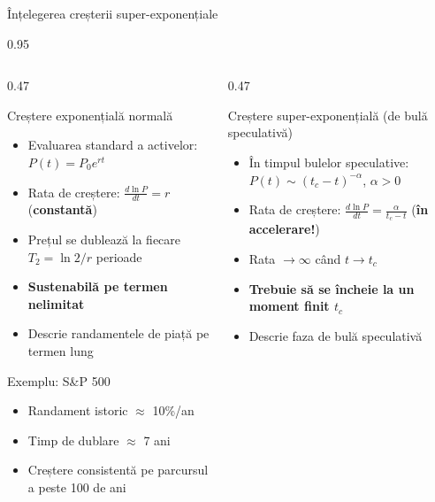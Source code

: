 \documentclass[9pt, aspectratio=169, t]{beamer}
\begin{document}
\begin{frame}{Înțelegerea creșterii super-exponențiale}
    \begin{cminipage}{0.95\textwidth}
    {\footnotesize
    \begin{columns}[T]
        \begin{column}{0.47\textwidth}
            \begin{block}{Creștere exponențială normală}
                \begin{itemize}\setlength{\itemsep}{0pt}
                    \item Evaluarea standard a activelor: $P(t) = P_0 e^{rt}$
                    \item Rata de creștere: $\frac{d\ln P}{dt} = r$ (\textbf{constantă})
                    \item Prețul se dublează la fiecare $T_2 = \ln 2 / r$ perioade
                    \item \textbf{Sustenabilă pe termen nelimitat}
                    \item Descrie randamentele de piață pe termen lung
                \end{itemize}
            \end{block}

            \begin{exampleblock}{Exemplu: S\&P 500}
                \begin{itemize}\setlength{\itemsep}{0pt}
                    \item Randament istoric $\approx$ 10\%/an
                    \item Timp de dublare $\approx$ 7 ani
                    \item Creștere consistentă pe parcursul a peste 100 de ani
                \end{itemize}
            \end{exampleblock}
        \end{column}
        \begin{column}{0.47\textwidth}
            \begin{alertblock}{Creștere super-exponențială (de bulă speculativă)}
                \begin{itemize}\setlength{\itemsep}{0pt}
                    \item În timpul bulelor speculative: $P(t) \sim (t_c - t)^{-\alpha}$, $\alpha > 0$
                    \item Rata de creștere: $\frac{d\ln P}{dt} = \frac{\alpha}{t_c - t}$ (\textbf{în accelerare!})
                    \item Rata $\to \infty$ când $t \to t_c$
                    \item \textbf{Trebuie să se încheie la un moment finit $t_c$}
                    \item Descrie faza de bulă speculativă
                \end{itemize}
            \end{alertblock}


\end{column}
\end{columns}}
\end{cminipage}
\end{frame}
\end{document}

